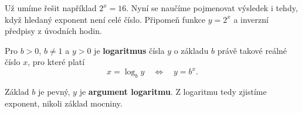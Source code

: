\documentclass[11pt,a4paper]{article}
\begin{document}
Už umíme řešit například $2^x=16$. Nyní se naučíme pojmenovat výsledek i tehdy, když hledaný exponent není celé číslo. Připomeň funkce $y=2^x$ a inverzní předpisy z úvodních hodin.
\begin{definiceBox}[title={Definice -- logaritmus}]
Pro $b>0$, $b\ne1$ a $y>0$ je \textbf{logaritmus} čísla $y$ o základu $b$ právě takové reálné číslo $x$, pro které platí
\[
x=\log_b y\quad\Longleftrightarrow\quad y=b^x.
\]
\end{definiceBox}
Základ $b$ je pevný, $y$ je \textbf{argument logaritmu}. Z logaritmu tedy zjistíme exponent, nikoli základ mocniny.
\end{document}
